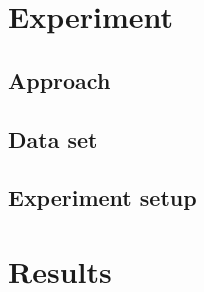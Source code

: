 \pagebreak
\section{Experiment}

\subsection{Approach}

\subsection{Data set}

\subsection{Experiment setup}


\section{Results}

